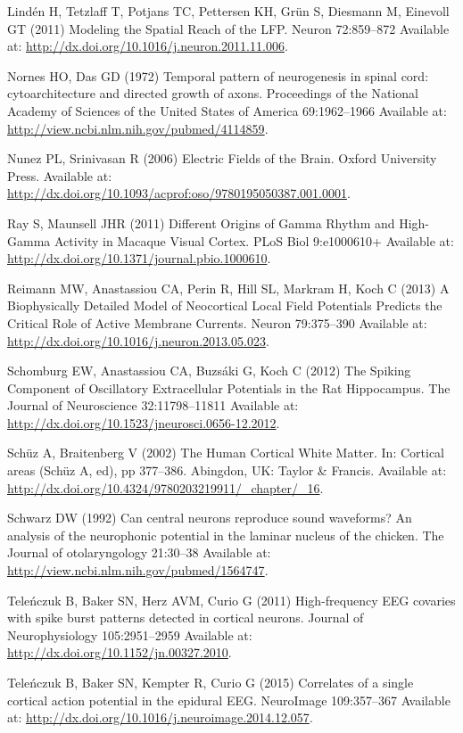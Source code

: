 \documentclass[]{article}
\begin{document}
\hypertarget{ref-Linden2011Modeling}{}
Lindén H, Tetzlaff T, Potjans TC, Pettersen KH, Grün S, Diesmann M,
Einevoll GT (2011) Modeling the Spatial Reach of the LFP. Neuron
72:859--872 Available at:
\url{http://dx.doi.org/10.1016/j.neuron.2011.11.006}.

\hypertarget{ref-Nornes1972Temporal}{}
Nornes HO, Das GD (1972) Temporal pattern of neurogenesis in spinal
cord: cytoarchitecture and directed growth of axons. Proceedings of the
National Academy of Sciences of the United States of America
69:1962--1966 Available at:
\url{http://view.ncbi.nlm.nih.gov/pubmed/4114859}.

\hypertarget{ref-Nunez2006Electric}{}
Nunez PL, Srinivasan R (2006) Electric Fields of the Brain. Oxford
University Press. Available at:
\url{http://dx.doi.org/10.1093/acprof:oso/9780195050387.001.0001}.

\hypertarget{ref-Ray2011Different}{}
Ray S, Maunsell JHR (2011) Different Origins of Gamma Rhythm and
High-Gamma Activity in Macaque Visual Cortex. PLoS Biol 9:e1000610+
Available at: \url{http://dx.doi.org/10.1371/journal.pbio.1000610}.

\hypertarget{ref-Reimann2013Biophysically}{}
Reimann MW, Anastassiou CA, Perin R, Hill SL, Markram H, Koch C (2013) A
Biophysically Detailed Model of Neocortical Local Field Potentials
Predicts the Critical Role of Active Membrane Currents. Neuron
79:375--390 Available at:
\url{http://dx.doi.org/10.1016/j.neuron.2013.05.023}.

\hypertarget{ref-Schomburg2012Spiking}{}
Schomburg EW, Anastassiou CA, Buzsáki G, Koch C (2012) The Spiking
Component of Oscillatory Extracellular Potentials in the Rat
Hippocampus. The Journal of Neuroscience 32:11798--11811 Available at:
\url{http://dx.doi.org/10.1523/jneurosci.0656-12.2012}.

\hypertarget{ref-Schuz2002Human}{}
Schüz A, Braitenberg V (2002) The Human Cortical White Matter. In:
Cortical areas (Schüz A, ed), pp 377--386. Abingdon, UK: Taylor \&
Francis. Available at:
\url{http://dx.doi.org/10.4324/9780203219911/_chapter/_16}.

\hypertarget{ref-Schwarz1992Can}{}
Schwarz DW (1992) Can central neurons reproduce sound waveforms? An
analysis of the neurophonic potential in the laminar nucleus of the
chicken. The Journal of otolaryngology 21:30--38 Available at:
\url{http://view.ncbi.nlm.nih.gov/pubmed/1564747}.

\hypertarget{ref-Telenczuk2011Highfrequency}{}
Teleńczuk B, Baker SN, Herz AVM, Curio G (2011) High-frequency EEG
covaries with spike burst patterns detected in cortical neurons. Journal
of Neurophysiology 105:2951--2959 Available at:
\url{http://dx.doi.org/10.1152/jn.00327.2010}.

\hypertarget{ref-Telenczuk2015Correlates}{}
Teleńczuk B, Baker SN, Kempter R, Curio G (2015) Correlates of a single
cortical action potential in the epidural EEG. NeuroImage 109:357--367
Available at: \url{http://dx.doi.org/10.1016/j.neuroimage.2014.12.057}.
\end{document}
